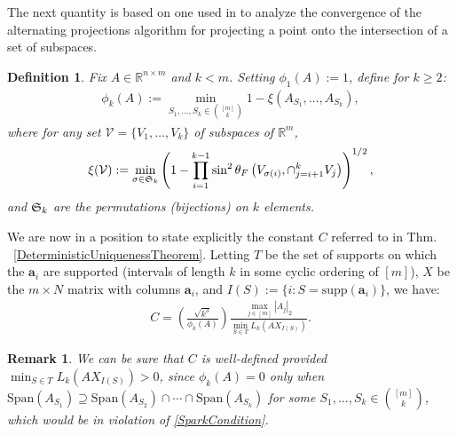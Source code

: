 \documentclass[journal, twocolumn]{IEEEtran}
\newtheorem{definition}{Definition}
\newtheorem{remark}{Remark}
\begin{document}
The next quantity is based on one used in \cite{Deutsch12} to analyze the convergence of the alternating projections algorithm for projecting a point onto the intersection of a set of subspaces.


\begin{definition}\label{SpecialSupportSet}
Fix $A \in \mathbb{R}^{n \times m}$ and $k < m$. Setting $\phi_1(A) := 1$, define for $k \geq 2$:
\begin{align*}
\phi_k(A) := \min_{ S_1,\ldots,S_k \in {[m] \choose k} } 1 - \xi( A_{S_1}, \ldots, A_{S_k}),
\end{align*}
where for any set $\mathcal{V} = \{V_1, \ldots, V_k\}$ of subspaces of $\mathbb{R}^m$, 
\begin{align*}
\xi(\mathcal{V}) := \min_{\sigma \in \frak{S}_k} \left(1 - \prod_{i=1}^{k-1} \sin^2  \theta_F \left(V_{\sigma(i)}, \cap_{j=i+1}^k V_j \right)  \right)^{1/2},
\end{align*}
and $\frak{S}_{k}$ are the permutations (bijections) on $k$ elements. 
\end{definition}

We are now in a position to state explicitly the constant $C$ referred to in Thm. ~\ref{DeterministicUniquenessTheorem}. Letting $T$ be the set of supports on which the $\mathbf{a}_i$ are supported (intervals of length $k$ in some cyclic ordering of $[m]$), $X$ be the $m \times N$ matrix with columns $\mathbf{a}_i$, and $I(S) := \{i : S = \text{supp}(\mathbf{a}_i)\}$, we have:
\begin{align}\label{Cdef}
C = \left( \frac{ \sqrt{k^3}}{ \phi_k(A) } \right) \frac{\max_{j \in [m]} |A_j|_2}{\min_{S \in T} L_k(AX_{I(S)})}.
\end{align}

\begin{remark}\label{nonzero}
We can be sure that $C$ is well-defined provided $\min_{S \in T} L_k(AX_{I(S)}) > 0$, since $\phi_k(A) = 0$ only when $\text{Span}(A_{S_1}) \supseteq \text{Span}(A_{S_2}) \cap \cdots \cap \text{Span}(A_{S_k})$ for some $S_1, \ldots, S_k \in {[m] \choose k}$, which would be in violation of \eqref{SparkCondition}.
\end{remark}
\end{document}
